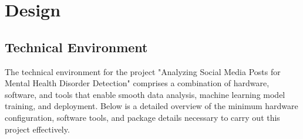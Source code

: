 
\section{Design}

\subsection{Technical Environment}
\noindent
The technical environment for the project "Analyzing Social Media Posts for Mental Health Disorder Detection" comprises a combination of hardware, software, and tools that enable smooth data analysis, machine learning model training, and deployment. Below is a detailed overview of the minimum hardware configuration, software tools, and package details necessary to carry out this project effectively. \\

